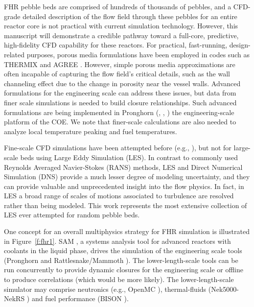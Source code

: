 FHR pebble beds are comprised of hundreds of thousands of pebbles, and a CFD-grade detailed description of the flow field through these pebbles for an entire reactor core is not practical with current simulation technology. However, this manuscript will demonstrate a credible pathway toward a full-core, predictive, high-fidelity CFD capability for these reactors. For practical, fast-running, design-related purposes, porous media formulations have been employed in codes such as THERMIX \cite{cleveland1986application} and AGREE \cite{seker2007multiphysics}. However, simple porous media approximations are often incapable of capturing the flow field's critical details, such as the wall channeling effect due to the change in porosity near the vessel walls.  Advanced formulations for the engineering scale can address these issues, but data from finer scale simulations is needed to build closure relationships. Such advanced formulations are being implemented in  Pronghorn (\cite{novak2018pronghorn}, \cite{novak1}, \cite{novak2}) the engineering-scale platform of the COE. We note that finer-scale calculations are also needed to analyze local temperature peaking and fuel temperatures.

Fine-scale CFD simulations have been attempted before (e.g., \cite{vanstaden2018}), but not for large-scale beds using Large Eddy Simulation (LES).  In contrast to commonly used  Reynolds Averaged Navier-Stokes (RANS) methods, LES and Direct Numerical Simulation (DNS) provide a much lesser degree of modeling uncertainty, and they can provide valuable and unprecedented insight into the flow physics. In fact, in LES a broad range of scales of motions associated to turbulence are resolved rather than being modeled. This work represents the most extensive collection of LES ever attempted for random pebble beds.

One concept for an overall multiphysics strategy for FHR simulation is illustrated in Figure~\ref{f:fhr1}. SAM \cite{hu2017sam}, a systems analysis tool for advanced reactors with coolants in the liquid phase, drives the simulation of the engineering scale tools (Pronghorn and Rattlesnake/Mammoth \cite{wang1}). The lower-length-scale tools can be run concurrently to provide dynamic closures for the engineering scale or offline to produce correlations (which would be more likely). The lower-length-scale simulator may comprise neutronics (e.g., OpenMC \cite{romano2013openmc}), thermal-fluids (Nek5000-NekRS \cite{fischer2008}) and fuel performance (BISON \cite{hales2013triso}).

